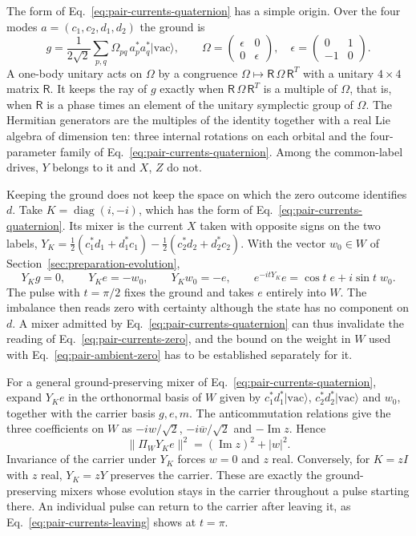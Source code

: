 \documentclass[11pt]{article}
\theoremstyle{definition}
\newcommand{\ket}[1]{\lvert #1\rangle}
\begin{document}
The form of Eq.~\eqref{eq:pair-currents-quaternion} has a simple origin. Over the four modes $a=(c_1,c_2,d_1,d_2)$ the ground is
\[
 g=\frac1{2\sqrt2}\sum_{p,q}\Omega_{pq}\,a_p^*a_q^*\ket{\mathrm{vac}},\qquad
 \Omega=\begin{pmatrix}\epsilon&0\\0&\epsilon\end{pmatrix},\quad
 \epsilon=\begin{pmatrix}0&1\\-1&0\end{pmatrix}.
\]
A one-body unitary acts on $\Omega$ by a congruence $\Omega\mapsto\mathsf R\,\Omega\,\mathsf R^T$ with a unitary $4\times4$ matrix $\mathsf R$. It keeps the ray of $g$ exactly when $\mathsf R\,\Omega\,\mathsf R^T$ is a multiple of $\Omega$, that is, when $\mathsf R$ is a phase times an element of the unitary symplectic group of $\Omega$. The Hermitian generators are the multiples of the identity together with a real Lie algebra of dimension ten: three internal rotations on each orbital and the four-parameter family of Eq.~\eqref{eq:pair-currents-quaternion}. Among the common-label drives, $Y$ belongs to it and $X$, $Z$ do not.

Keeping the ground does not keep the space on which the zero outcome identifies $d$. Take $K=\operatorname{diag}(i,-i)$, which has the form of Eq.~\eqref{eq:pair-currents-quaternion}. Its mixer is the current $X$ taken with opposite signs on the two labels, $Y_K=\tfrac12(c_1^*d_1+d_1^*c_1)-\tfrac12(c_2^*d_2+d_2^*c_2)$. With the vector $w_0\in W$ of Section~\ref{sec:preparation-evolution},
\begin{equation}
 Y_Kg=0,\qquad Y_Ke=-w_0,\qquad Y_Kw_0=-e,\qquad e^{-itY_K}e=\cos t\;e+i\sin t\;w_0 .
 \label{eq:pair-currents-leaving}
\end{equation}
The pulse with $t=\pi/2$ fixes the ground and takes $e$ entirely into $W$. The imbalance then reads zero with certainty although the state has no component on $d$. A mixer admitted by Eq.~\eqref{eq:pair-currents-quaternion} can thus invalidate the reading of Eq.~\eqref{eq:pair-currents-zero}, and the bound on the weight in $W$ used with Eq.~\eqref{eq:pair-ambient-zero} has to be established separately for it.

For a general ground-preserving mixer of Eq.~\eqref{eq:pair-currents-quaternion}, expand $Y_Ke$ in the orthonormal basis of $W$ given by $c_1^*d_1^*\ket{\mathrm{vac}}$, $c_2^*d_2^*\ket{\mathrm{vac}}$ and $w_0$, together with the carrier basis $g,e,m$. The anticommutation relations give the three coefficients on $W$ as $-iw/\sqrt2$, $-i\overline w/\sqrt2$ and $-\operatorname{Im}z$. Hence
\begin{equation}
 \|\Pi_W Y_Ke\|^2=(\operatorname{Im}z)^2+|w|^2 .
 \label{eq:pair-currents-carrier-leakage}
\end{equation}
Invariance of the carrier under $Y_K$ forces $w=0$ and $z$ real. Conversely, for $K=zI$ with $z$ real, $Y_K=zY$ preserves the carrier. These are exactly the ground-preserving mixers whose evolution stays in the carrier throughout a pulse starting there. An individual pulse can return to the carrier after leaving it, as Eq.~\eqref{eq:pair-currents-leaving} shows at $t=\pi$.
\end{document}
